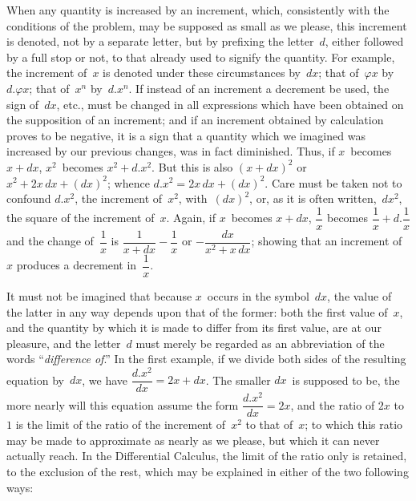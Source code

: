 \documentclass[12pt]{book}[2005/09/16]
\newcommand{\Pagelabel}[1]{\phantomsection\label{page:#1}}
\newcommand{\PageSep}[1]{\Pagelabel{#1}\ignorespaces}
\renewcommand{\(}{{\upshape(}}
\renewcommand{\)}{{\upshape)}}
\renewcommand{\phi}{\varphi}
\begin{document}
When any quantity is increased by an increment,
which, consistently with the conditions of the problem,
may be supposed as small as we please, this increment
is denoted, not by a separate letter, but by
prefixing the letter~$d$, either followed by a full stop or
not, to that already used to signify the quantity. For
example, the increment of~$x$ is denoted under these
circumstances by~$dx$; that of~$\phi x$ by~$d.\phi x$; that of~$x^{n}$
by~$d.x^{n}$. If instead of an increment a decrement
be used, the sign of~$dx$, etc., must be changed in all
expressions which have been obtained on the supposition
of an increment; and if an increment obtained
by calculation proves to be negative, it is a sign that
a quantity which we imagined was increased by our
previous changes, was in fact diminished. Thus, if
$x$~becomes $x + dx$, $x^{2}$~becomes $x^{2} + d.x^{2}$. But this is
also $(x + dx)^{2}$ or $x^{2} + 2x\, dx + (dx)^{2}$; whence $d.x^{2} = 2x\, dx + (dx)^{2}$.
Care must be taken not to confound
$d.x^{2}$, the increment of~$x^{2}$, with~$(dx)^{2}$, or, as it is often
written,~$dx^{2}$, the square of the increment of~$x$. Again,
\PageSep{26}
if $x$~becomes $x + dx$, $\dfrac{1}{x}$ becomes $\dfrac{1}{x} + d.\dfrac{1}{x}$ and the
change of~$\dfrac{1}{x}$ is $\dfrac{1}{x + dx} - \dfrac{1}{x}$ or $-\dfrac{dx}{x^{2} + x\, dx}$; showing
that an increment of~$x$ produces a decrement in~$\dfrac{1}{x}$.

It must not be imagined that because $x$~occurs in
the symbol~$dx$, the value of the latter in any way depends
upon that of the former: both the first value of~$x$,
and the quantity by which it is made to differ from
its first value, are at our pleasure, and the letter~$d$ must
merely be regarded as an abbreviation of the words
``\emph{difference of}.'' In the first example, if we divide
%
both sides of the resulting equation by~$dx$, we have
$\dfrac{d.x^{2}}{dx} = 2x + dx$. The smaller $dx$~is supposed to be,
the more nearly will this equation assume the form
$\dfrac{d.x^{2}}{dx} = 2x$, and the ratio of $2x$ to~$1$ is the limit of the
%
ratio of the increment of~$x^{2}$ to that of~$x$; to which
this ratio may be made to approximate as nearly as
we please, but which it can never actually reach. In
the Differential Calculus, the limit of the ratio only is
retained, to the exclusion of the rest, which may be
explained in either of the two following ways:
\end{document}
